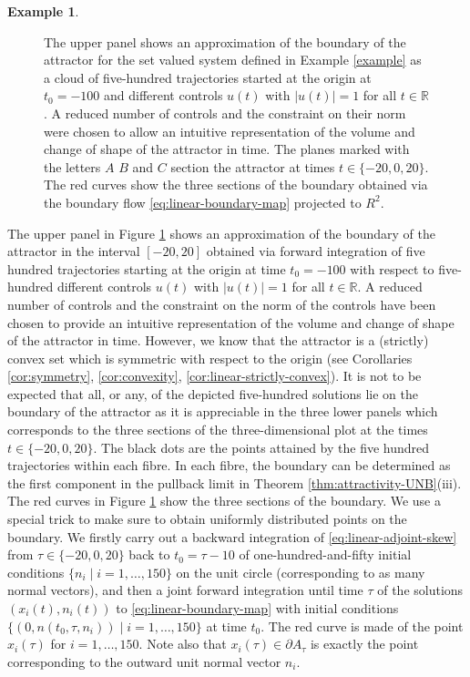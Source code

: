 \documentclass[reqno]{amsart}
\theoremstyle{definition}
\newtheorem{example}[thm]{Example}
\numberwithin{equation}{section}
\newcommand{\R}{\mathbb{R}}
\begin{document}
\begin{example}
\begin{figure}[h]
    \vspace{3mm}
    \caption{The upper panel shows an approximation of the boundary of the attractor for the set valued system defined in Example \ref{example} as a cloud of five-hundred trajectories started at the origin at $t_0=-100$ and different controls $u(t)$ with $|u(t)|=1$ for all $t\in\R$. A reduced number of controls and the constraint on their  norm were chosen to allow an intuitive representation of the volume and change of shape of the attractor in time.  The planes marked with the letters $A$ $B$ and $C$ section the attractor at times $t\in\{-20,0,20\}$. The red curves show the three sections of the boundary obtained via the boundary flow \eqref{eq:linear-boundary-map} projected to $R^2$.}
    \label{fig:attractor}
\end{figure} 
    The upper panel in Figure \ref{fig:attractor} shows an approximation of the boundary of the attractor in the interval $[-20,20]$ obtained via forward integration of five hundred trajectories starting at the origin at time $t_0=-100$ with respect to five-hundred different controls $u(t)$ with $|u(t)|=1$ for all $t\in\R$.  
    A reduced number of controls and the constraint on the norm of the controls have been chosen to provide an intuitive representation of the volume and change of shape of the attractor in time. 
    However, we know that the attractor is a (strictly) convex set which is symmetric with respect to the origin (see Corollaries \ref{cor:symmetry}, \ref{cor:convexity}, \ref{cor:linear-strictly-convex}). 
    It is not to be expected that all, or any, of the depicted five-hundred solutions lie on the boundary of the attractor as it is appreciable in the three lower panels which corresponds to the three sections of the three-dimensional plot at the times $t\in\{-20,0,20\}$.  
    The black dots are the points attained by the five hundred trajectories within each fibre. In each fibre, the boundary can be determined as the first component in the pullback limit in Theorem \ref{thm:attractivity-UNB}(iii). The red curves in Figure \ref{fig:attractor} show the three sections of the boundary. We use a special trick to make sure to obtain uniformly distributed points on the boundary. We firstly carry out a backward integration of \eqref{eq:linear-adjoint-skew} from $\tau\in\{-20,0,20\}$ back to $t_0=\tau-10$ of one-hundred-and-fifty initial conditions $\{n_i\mid i=1,\dots,150\}$ on the unit circle (corresponding to as many normal vectors), and then a joint forward integration until time $\tau$ of the solutions $(x_i(t),n_i(t))$ to \eqref{eq:linear-boundary-map} with initial conditions $\{(0,n(t_0,\tau,n_i))\mid i=1,\dots,150\}$ at time $t_0$. The red curve is made of the point $x_i(\tau)$ for $i=1,\dots,150$. Note also that $x_i(\tau)\in\partial A_\tau$ is exactly the point corresponding to the outward unit normal vector $n_i$.
\end{example}
\end{document}
